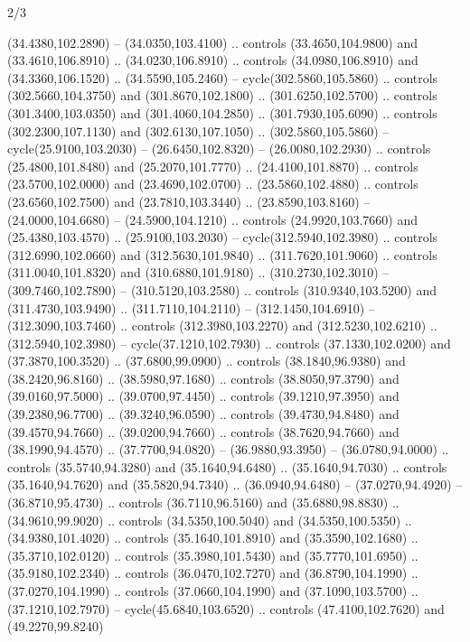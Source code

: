 \begin{flagdescription}{2/3}
\begin{scope}[xshift=0.5\flaglength,yshift=0.5\flagwidth,scale=\stretchfactor]
\begin{scope}[scale=0.001645\flagwidth,yshift=65mm,xshift=-63mm]
\begin{scope}[y=0.80pt, x=0.80pt, yscale=-1,]
\begin{scope}[cm={{1.33333,0.0,0.0,1.33333,(0.0,1e-05)}}]
  (34.4380,102.2890) -- (34.0350,103.4100) .. controls (33.4650,104.9800) and
  (33.4610,106.8910) .. (34.0230,106.8910) .. controls (34.0980,106.8910) and
  (34.3360,106.1520) .. (34.5590,105.2460) -- cycle(302.5860,105.5860) ..
  controls (302.5660,104.3750) and (301.8670,102.1800) .. (301.6250,102.5700) ..
  controls (301.3400,103.0350) and (301.4060,104.2850) .. (301.7930,105.6090) ..
  controls (302.2300,107.1130) and (302.6130,107.1050) .. (302.5860,105.5860) --
  cycle(25.9100,103.2030) -- (26.6450,102.8320) -- (26.0080,102.2930) ..
  controls (25.4800,101.8480) and (25.2070,101.7770) .. (24.4100,101.8870) ..
  controls (23.5700,102.0000) and (23.4690,102.0700) .. (23.5860,102.4880) ..
  controls (23.6560,102.7500) and (23.7810,103.3440) .. (23.8590,103.8160) --
  (24.0000,104.6680) -- (24.5900,104.1210) .. controls (24.9920,103.7660) and
  (25.4380,103.4570) .. (25.9100,103.2030) -- cycle(312.5940,102.3980) ..
  controls (312.6990,102.0660) and (312.5630,101.9840) .. (311.7620,101.9060) ..
  controls (311.0040,101.8320) and (310.6880,101.9180) .. (310.2730,102.3010) --
  (309.7460,102.7890) -- (310.5120,103.2580) .. controls (310.9340,103.5200) and
  (311.4730,103.9490) .. (311.7110,104.2110) -- (312.1450,104.6910) --
  (312.3090,103.7460) .. controls (312.3980,103.2270) and (312.5230,102.6210) ..
  (312.5940,102.3980) -- cycle(37.1210,102.7930) .. controls (37.1330,102.0200)
  and (37.3870,100.3520) .. (37.6800,99.0900) .. controls (38.1840,96.9380) and
  (38.2420,96.8160) .. (38.5980,97.1680) .. controls (38.8050,97.3790) and
  (39.0160,97.5000) .. (39.0700,97.4450) .. controls (39.1210,97.3950) and
  (39.2380,96.7700) .. (39.3240,96.0590) .. controls (39.4730,94.8480) and
  (39.4570,94.7660) .. (39.0200,94.7660) .. controls (38.7620,94.7660) and
  (38.1990,94.4570) .. (37.7700,94.0820) -- (36.9880,93.3950) --
  (36.0780,94.0000) .. controls (35.5740,94.3280) and (35.1640,94.6480) ..
  (35.1640,94.7030) .. controls (35.1640,94.7620) and (35.5820,94.7340) ..
  (36.0940,94.6480) -- (37.0270,94.4920) -- (36.8710,95.4730) .. controls
  (36.7110,96.5160) and (35.6880,98.8830) .. (34.9610,99.9020) .. controls
  (34.5350,100.5040) and (34.5350,100.5350) .. (34.9380,101.4020) .. controls
  (35.1640,101.8910) and (35.3590,102.1680) .. (35.3710,102.0120) .. controls
  (35.3980,101.5430) and (35.7770,101.6950) .. (35.9180,102.2340) .. controls
  (36.0470,102.7270) and (36.8790,104.1990) .. (37.0270,104.1990) .. controls
  (37.0660,104.1990) and (37.1090,103.5700) .. (37.1210,102.7970) --
  cycle(45.6840,103.6520) .. controls (47.4100,102.7620) and (49.2270,99.8240)

\end{scope}
\end{scope}
\end{scope}
\end{scope}
\end{flagdescription}
